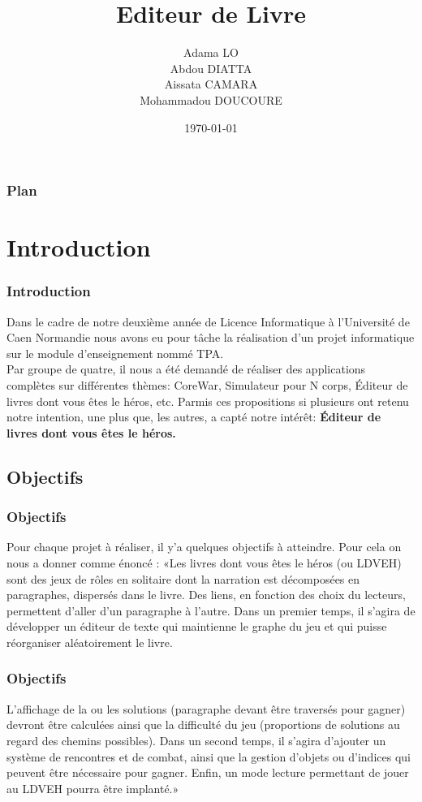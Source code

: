 \documentclass{beamer}
\title{Editeur de Livre}
\date{\today}
\author{Adama LO\\Abdou DIATTA\\Aissata CAMARA\\Mohammadou DOUCOURE}
\institute{Université de Caen Normandie}
\begin{document}
\maketitle

\begin{frame} 
\frametitle{Plan}
\tableofcontents
\end{frame}
\section{\textbf{ Introduction}}

\begin{frame}
\frametitle{Introduction}
Dans le cadre de notre deuxième année de Licence Informatique  à l’Université de Caen Normandie nous avons eu pour tâche la réalisation d'un projet informatique sur le module d’enseignement nommé TPA. \\
Par groupe de quatre, il nous a été demandé de réaliser des applications complètes sur différentes thèmes: CoreWar, Simulateur pour N corps, Éditeur de livres dont vous êtes le héros, etc. Parmis ces propositions si plusieurs ont retenu notre intention, une plus que, les autres, a capté notre intérêt: \textbf{Éditeur de livres dont vous êtes le héros.}




\end{frame}
\begin{frame}
\subsection{Objectifs}
\frametitle{Objectifs}

 Pour chaque projet à réaliser, il y'a quelques objectifs à atteindre. Pour cela on nous a donner comme énoncé :
«Les livres dont vous êtes le héros (ou LDVEH) sont des jeux de rôles en solitaire dont la narration est décomposées en paragraphes, dispersés dans le livre. Des liens, en fonction des choix du lecteurs, permettent d’aller d’un paragraphe à l’autre. Dans un premier temps, il s’agira de développer un éditeur de texte qui maintienne le graphe du jeu et qui puisse réorganiser aléatoirement le livre. \\

\end{frame}


\begin{frame}
\frametitle{Objectifs}
 L’affichage de la ou les solutions (paragraphe devant être traversés pour gagner) devront être calculées ainsi que la difficulté du jeu (proportions de solutions au regard des chemins possibles). Dans un second temps, il s’agira d’ajouter un système de rencontres et de combat, ainsi que la gestion d’objets ou d’indices qui peuvent être nécessaire pour gagner. Enfin, un mode lecture permettant de jouer au LDVEH pourra être implanté.» 
\end{frame}
\end{document}
